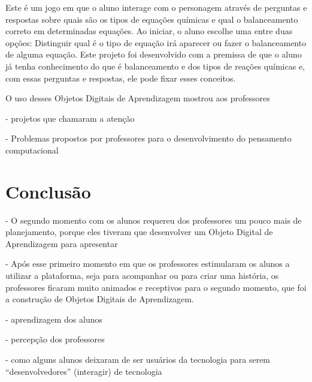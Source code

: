 \documentclass[12pt, openright, a4paper, brazil, english, french, spanish, bibjustif, openany, oneside]{abntex2}
\begin{document}
Este é um jogo em que o aluno interage com o personagem através de perguntas e respostas sobre quais são os tipos de equações químicas e qual o balanceamento correto em determinadas equações. Ao iniciar, o aluno escolhe uma entre duas opções: Distinguir qual é o tipo de equação irá aparecer ou fazer o balanceamento de alguma equação. Este projeto foi desenvolvido com a premissa de que o aluno já tenha conhecimento do que é balanceamento e dos tipos de reações químicas e, com essas perguntas e respostas, ele pode fixar esses conceitos.

O uso desses Objetos Digitais de Aprendizagem mostrou aos professores

- projetos que chamaram a atenção

- Problemas propostos por professores para o desenvolvimento do pensamento computacional


\chapter*[Conclusão]{Conclusão}

- O segundo momento com os alunos requereu dos professores um pouco mais de planejamento, porque eles tiveram que desenvolver um Objeto Digital de Aprendizagem para apresentar



- Após esse primeiro momento em que os professores estimularam os alunos a utilizar a plataforma, seja para acompanhar ou para criar uma história, os professores ficaram muito animados e receptivos para o segundo momento, que foi a construção de Objetos Digitais de Aprendizagem.

- aprendizagem dos alunos

- percepção dos professores

- como alguns alunos deixaram de ser usuários da tecnologia para serem ``desenvolvedores'' (interagir) de tecnologia


% 



\postextual

\end{document}
